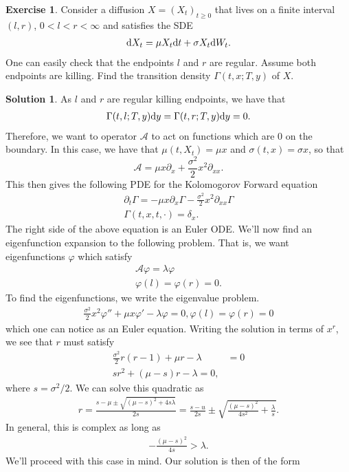 \documentclass[12pt]{article}
\renewcommand{\phi}{\varphi}
\theoremstyle{definition}
\newtheorem{exer}{Exercise}
\newtheorem{sol}{Solution}
\theoremstyle{remark}
\def\d{{\rm d}}
\begin{document}
\begin{exer}
    Consider a diffusion $X = (X_{t})_{t\geq 0}$ that lives on a finite interval $(l,r)$,  $0 < l < r < \infty$ and satisfies the SDE
    \begin{align*}
    \d X_{t} = \mu X_{t} \d t + \sigma X_{t} \d W_{t}.
    \end{align*}
    One can easily check that the endpoints $l$ and $r$ are regular. Assume both endpoints are killing. Find the transition density $\Gamma(t, x; T, y)$ of $X$.
\end{exer}

\begin{sol}
As $l$ and $r$ are regular killing endpoints, we have that
    \begin{align*}
        \Gamma(t, l; T, y) \d y = \Gamma(t, r; T, y) \d y = 0.
    \end{align*}
    Therefore, we want to operator $\mathcal{A}$ to act on functions which are 0 on the boundary. In this case, we have that $\mu(t, X_{t}) = \mu x$ and $\sigma(t, x) = \sigma x$, so that 
\begin{equation*}
    \mathcal{A} = \mu x \partial_{x}  + \frac{\sigma^{2}}{2} x^{2} \partial_{xx}.
\end{equation*}
    This then gives the following PDE for the Kolomogorov Forward equation
    \begin{align*}
        \partial_{t} \Gamma = -\mu x \partial_{x} \Gamma - \frac{\sigma^{2}}{2} x^{2} \partial_{xx} \Gamma\\
        \Gamma(t, x, t, \cdot) = \delta_{x}.
    \end{align*}
    The right side of the above equation is an Euler ODE. We'll now find an eigenfunction expansion to the following problem. That is, we want eigenfunctions $\phi$ which satisfy
    \begin{align*}
        \mathcal{A} \phi = \lambda \phi \\
        \phi(l) = \phi(r) = 0.
    \end{align*}
To find the eigenfunctions, we write the eigenvalue problem.
    \begin{align*}
        \frac{\sigma^{2}}{2}x^{2} \phi'' + \mu x \phi' - \lambda \phi = 0, \phi(l) = \phi(r) = 0
    \end{align*}
    which one can notice as an Euler equation. Writing the solution in terms of $x^{r}$, we see that $r$ must satisfy
    \begin{align*}
        \frac{\sigma^{2}}{2} r(r - 1) + \mu r - \lambda &= 0\\
        s r^{2}  + (\mu - s) r - \lambda = 0,
    \end{align*}
    where $s = \sigma^{2} / 2$. We can solve this quadratic as
    \begin{align*}
        r = \frac{s - \mu \pm \sqrt{ (\mu - s)^{2} + 4s\lambda}}{2s} = \frac{s-u}{2s} \pm \sqrt{ \frac{(\mu - s)^{2}}{4s^{2}} + \frac{\lambda}{s} }.
    \end{align*}
    In general, this is complex as long as
    \begin{align*}
        -\frac{(\mu - s)^{2}}{4s} > \lambda.
    \end{align*}
    We'll proceed with this case in mind. Our solution is then of the form


\end{sol}
\end{document}
